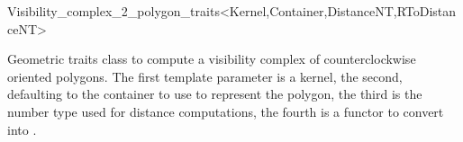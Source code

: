 
\begin{ccRefClass}{Visibility_complex_2_polygon_traits<Kernel,Container,DistanceNT,RToDistanceNT>}

\ccDefinition

Geometric traits class to compute a visibility complex of counterclockwise
oriented polygons. The first template parameter is a kernel, the second,
defaulting to  the container to use to
represent the polygon, the third is the number type used for distance
computations, the fourth is a functor to convert  into
.



\ccIsModel
{}

\ccSeeAlso

\\
\\
\\

\ccTagDefaults
\end{ccRefClass}
\ccRefPageEnd


